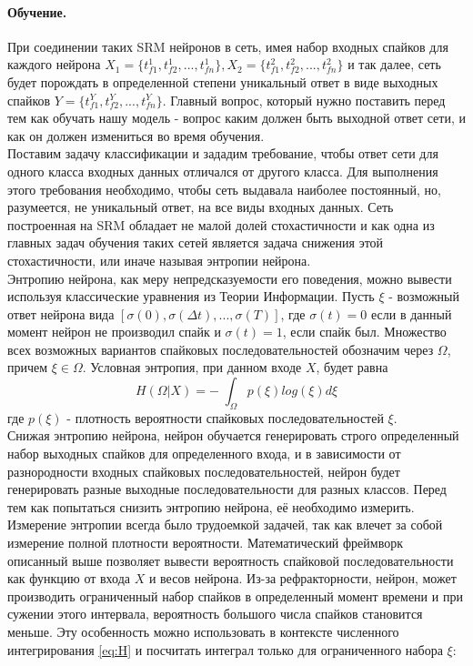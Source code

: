 \documentclass[a4paper,10pt]{article}
\begin{document}
\paragraph*{Обучение.} При соединении таких SRM нейронов в сеть, имея набор входных спайков для каждого нейрона $X_{1}=\{t_{f1}^1, t_{f2}^1, ...,t_{fn}^1\}, X_{2}=\{t_{f1}^2, t_{f2}^2,...,t_{fn}^2\}$ и так далее, сеть будет порождать в определенной степени уникальный ответ в виде выходных спайков $Y=\{t_{f1}^Y, t_{f2}^Y,...,t_{fn}^Y\}$. Главный вопрос, который нужно поставить перед тем как обучать нашу модель - вопрос каким должен быть выходной ответ сети, и как он должен измениться во время обучения.\\
\indent Поставим задачу классификации и зададим требование, чтобы ответ сети для одного класса входных данных отличался от другого класса. Для выполнения этого требования необходимо, чтобы сеть выдавала наиболее постоянный, но, разумеется, не уникальный ответ, на все виды входных данных. Сеть построенная на SRM обладает не малой долей стохастичности и как одна из главных задач обучения таких сетей является задача снижения этой стохастичности, или иначе называя энтропии нейрона.\\
\indent Энтропию нейрона, как меру непредсказуемости его поведения, можно вывести используя классические уравнения из Теории Информации. Пусть $\xi$ - возможный ответ нейрона вида $[\sigma(0),\sigma(\Delta t),...,\sigma(T)]$, где $\sigma(t)=0$ если в данный момент нейрон не производил спайк и $\sigma(t)=1$, если спайк был. Множество всех возможных вариантов спайковых последовательностей обозначим через $\Omega$, причем $\xi\in\Omega$. Условная энтропия, при данном входе $X$, будет равна
\begin{equation}\label{eq:H}
H(\Omega|X) = -\;\int_{\Omega} p(\xi)log(\xi)d\xi
\end{equation}
где $p(\xi)$ - плотность вероятности спайковых последовательностей $\xi$.\\
\indent Снижая энтропию нейрона, нейрон обучается генерировать строго определенный набор выходных спайков для определенного входа, и в зависимости от разнородности входных спайковых последовательностей, нейрон будет генерировать разные выходные последовательности для разных классов. Перед тем как попытаться снизить энтропию нейрона, её необходимо измерить.\\
\indent Измерение энтропии всегда было трудоемкой задачей, так как влечет за собой измерение полной плотности вероятности. Математический фреймворк описанный выше позволяет вывести вероятность спайковой последовательности как функцию от входа $X$ и весов нейрона. Из-за рефракторности, нейрон, может производить ограниченный набор спайков в определенный момент времени и при сужении этого интервала, вероятность большого числа спайков становится меньше. Эту особенность можно использовать в контексте численного интегрирования \ref{eq:H} и посчитать интеграл только для ограниченного набора $\xi$:
\end{document}
